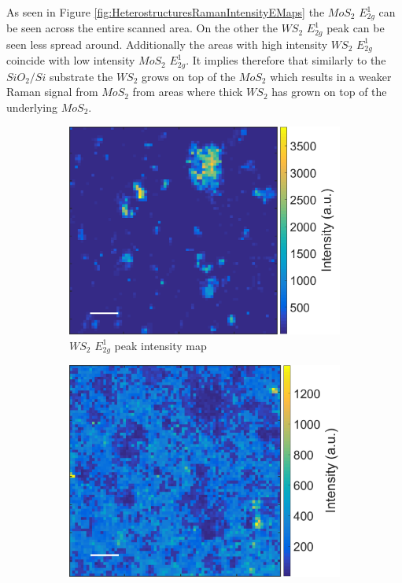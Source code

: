 As seen in Figure \ref{fig:HeterostructuresRamanIntensityEMaps} the $MoS_2$ $E^1_{2g}$ can be seen across the entire scanned area. On the other the $WS_2$ $E^1_{2g}$ peak can be seen less spread around. Additionally the areas with high intensity $WS_2$ $E^1_{2g}$ coincide with low intensity $MoS_2$ $E^1_{2g}$. It implies therefore that similarly to the $SiO_2/Si$ substrate the $WS_2$ grows on top of the $MoS_2$ which results in a weaker Raman signal from $MoS_2$ from areas where thick $WS_2$ has grown on top of the underlying $MoS_2$. 

\begin{figure}[h]
	\begin{center}
		\begin{subfigure}[b]{0.5\textwidth}
			\includegraphics[scale=0.25]{Heterostructures/HeterostructuresRamanIntensityEWAu.png}
			\caption{$WS_2$ $E^1_{2g}$ peak intensity map}
			\label{fig:HeterostructuresRamanIntensityEWAu}
		\end{subfigure}
		\begin{subfigure}[b]{0.45\textwidth}
			\includegraphics[scale=0.25]{Heterostructures/HeterostructuresRamanIntensityEMoAu.png}

\end{subfigure}
\end{center}
\end{figure}
